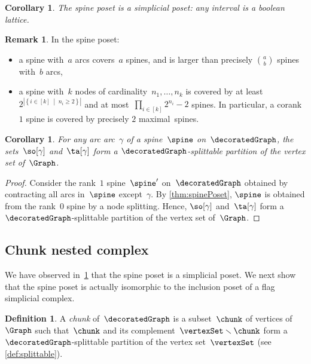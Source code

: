 \documentclass{amsart}
\newtheorem{corollary}[theorem]{Corollary}
\theoremstyle{definition}
\newtheorem{definition}[theorem]{Definition}
\newtheorem{remark}[theorem]{Remark}
\newcommand{\set}[2]{\left\{ #1 \;\middle|\; #2 \right\}} %
\newcommand{\ssm}{\smallsetminus} %
\newcommand{\darkblue}{\color{darkblue}} %
\newcommand{\defn}[1]{\textsl{\darkblue #1}} %
\newcommand{\vincent}[1]{\todo[color=blue!30]{#1 \\ \hfill --- V.}}
\begin{document}
\begin{corollary}
  \label{coro:simplicialPoset}
  The spine poset is a simplicial poset: any interval is a boolean lattice.
  \vincent{todo}
\end{corollary}

\begin{remark}
  In the spine poset:
  \begin{itemize}
    \item a spine with~$a$ arcs covers~$a$ spines, and is larger than precisely $\binom{a}{b}$ spines with~$b$ arcs,
    \item a spine with~$k$ nodes of cardinality~$n_1, \dots, n_k$ is covered by at least~$2^{|\set{i \in [k]}{n_i \ge 2}|}$ and at most~$\prod_{i \in [k]} 2^{n_i}-2$ spines. In particular, a corank~$1$ spine is covered by precisely $2$ maximal~spines.
  \end{itemize}
\end{remark}

\begin{corollary}
  \label{coro:splittablePartitions}
  For any arc arc~$\gamma$ of a spine~$\spine$ on~$\decoratedGraph$, the sets~$\so[\gamma]$ and~$\ta[\gamma]$ form a $\decoratedGraph$-splittable partition of the vertex set of~$\Graph$.
\end{corollary}

\begin{proof}
  Consider the rank~$1$ spine~$\spine'$ on~$\decoratedGraph$ obtained by contracting all arcs in~$\spine$ except~$\gamma$. 
  By \cref{thm:spinePoset}, $\spine$ is obtained from the rank~$0$ spine by a node splitting. 
  Hence, $\so[\gamma]$ and~$\ta[\gamma]$ form a $\decoratedGraph$-splittable partition of the vertex set of~$\Graph$.
\end{proof}


\subsection{Chunk nested complex}
\label{subsec:nestedComplex}

We have observed in~\cref{coro:simplicialPoset} that the spine poset is a simplicial poset.
We next show that the spine poset is actually isomorphic to the inclusion poset of a flag simplicial complex.

\begin{definition}
  \label{def:chunk}
  A \defn{chunk} of~$\decoratedGraph$ is a subset~$\chunk$ of vertices of~$\Graph$ such that~$\chunk$ and its complement~$\vertexSet \ssm \chunk$ form a $\decoratedGraph$-splittable partition of the vertex set~$\vertexSet$ (see \cref{def:splittable}).
\end{definition}
\end{document}
